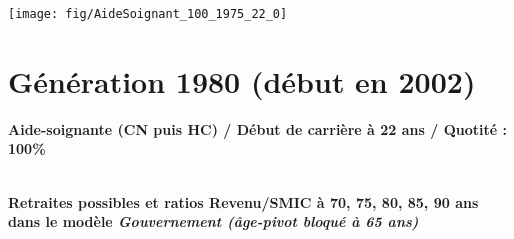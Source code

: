  \vspace{0.1cm} 

 {\hspace{-2.2cm}\texttt{[image: fig/AideSoignant\_100\_1975\_22\_0]}} 

\newpage 
 
\section{Génération 1980 (début en 2002)\label{AideSoignant_100_1980_22_0}} 
 
{\bf \noindent Aide-soignante (CN puis HC) / Début de carrière à 22 ans / Quotité : 100\%}  ~ 

 ~\\{\bf \noindent Retraites possibles et ratios Revenu/SMIC à 70, 75, 80, 85, 90 ans dans le modèle \emph{Gouvernement (âge-pivot bloqué à 65 ans)}}  
 
